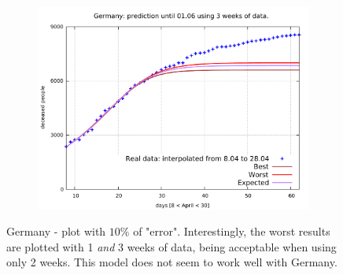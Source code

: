 \documentclass[8pt]{article}
\begin{document}
\begin{figure}[h!]
\begin{subfigure}[b]{0.45\linewidth}
  \includegraphics[width=\linewidth]{../err10p_simulations/de/8-28/8-28.pdf}
  \end{subfigure}
	\caption{Germany - plot with $10\%$ of "error". Interestingly, the worst
	results are plotted with 1 \emph{and} 3 weeks of data, being
	acceptable when using only 2 weeks. This model does not seem
	to work well with Germany.}
\end{figure}
\end{document}
